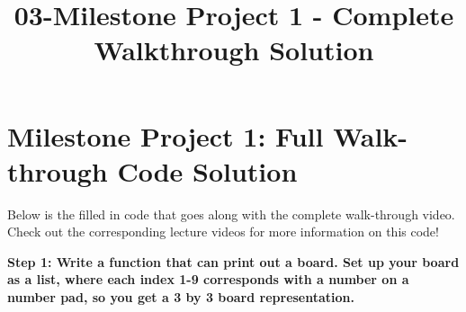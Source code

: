 \documentclass[11pt]{article}
\title{03-Milestone Project 1 - Complete Walkthrough Solution}
\begin{document}
    
    
    \maketitle
    
    

    
    \section{Milestone Project 1: Full Walk-through Code
Solution}\label{milestone-project-1-full-walk-through-code-solution}

Below is the filled in code that goes along with the complete
walk-through video. Check out the corresponding lecture videos for more
information on this code!

    \textbf{Step 1: Write a function that can print out a board. Set up your
board as a list, where each index 1-9 corresponds with a number on a
number pad, so you get a 3 by 3 board representation.}
\end{document}
